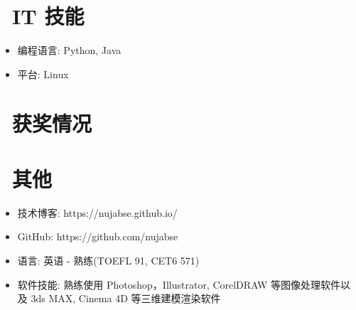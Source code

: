 \documentclass{resume}
\begin{document}
\section{\faCogs\ IT 技能}
\begin{itemize}[parsep=0.5ex]
  \item 编程语言: Python, Java
  \item 平台: Linux
\end{itemize}

\section{\faHeartO\ 获奖情况}

\section{\faInfo\ 其他}
\begin{itemize}[parsep=0.5ex]
  \item 技术博客: https://nujabse.github.io/
  \item GitHub: https://github.com/nujabse
  \item 语言: 英语 - 熟练(TOEFL 91, CET6 571)
  \item 软件技能: 熟练使用 Photoshop，Illustrator, CorelDRAW 等图像处理软件以及 3ds MAX, Cinema 4D 等三维建模渲染软件
\end{itemize}

%
%
\end{document}
